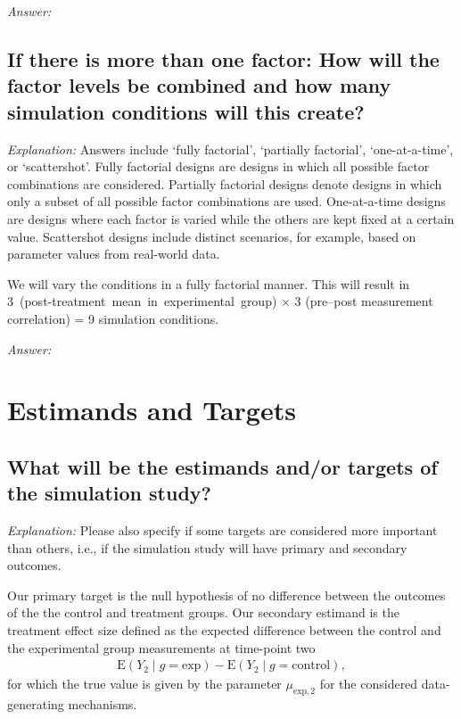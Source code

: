 \documentclass[12pt]{article}
\begin{document}
\textit{Answer:}

\subsection{If there is more than one factor: How will the factor levels be combined and how many simulation conditions will this create?}

\textit{Explanation:}  Answers include `fully factorial', `partially factorial', `one-at-a-time', or `scattershot'. Fully factorial designs are designs in which all possible factor combinations are considered. Partially factorial designs denote designs in which only a subset of all possible factor combinations are used. One-at-a-time designs are designs where each factor is varied while the others are kept fixed at a certain value. Scattershot designs include distinct scenarios, for example, based on parameter values from real-world data.

\begin{examplebox}
We will vary the conditions in a fully factorial manner. This will result in \mbox{3 (post-treatment mean in experimental group)} $\times$ 3 (pre--post measurement correlation) = 9 simulation conditions.
\end{examplebox}

\textit{Answer:}


\section{Estimands and Targets}
\subsection{What will be the estimands and/or targets of the simulation study?}

\textit{Explanation:} Please also specify if some targets are considered more important than others, i.e., if the simulation study will have primary and secondary outcomes.

\begin{examplebox}
Our primary target is the null hypothesis of no difference between the outcomes of the the control and treatment groups. Our secondary estimand is the treatment effect size defined as the expected difference between the control and the experimental group measurements at time-point two
\begin{align*}
    \text{E}(Y_2 \mid g=\text{exp}) - \text{E}(Y_2 \mid g=\text{control}),
\end{align*}
for which the true value is given by the parameter $\mu_{\text{exp},2}$ for the considered data-generating mechanisms.
\end{examplebox}
\end{document}
